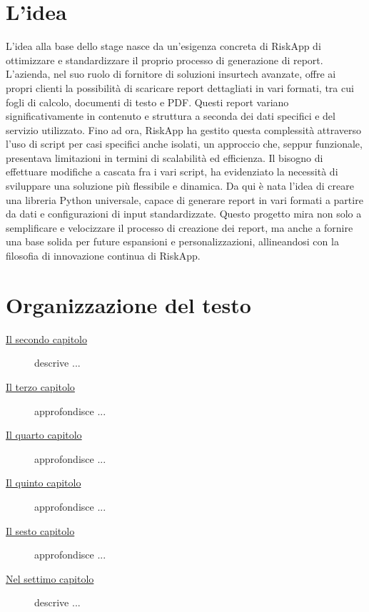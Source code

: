 \section{L'idea}
L'idea alla base dello stage nasce da un'esigenza concreta di RiskApp di ottimizzare e standardizzare il proprio processo di generazione di report. L'azienda, nel suo ruolo di fornitore di soluzioni insurtech avanzate, offre ai propri clienti la possibilità di scaricare report dettagliati in vari formati, tra cui fogli di calcolo, documenti di testo e PDF. Questi report variano significativamente in contenuto e struttura a seconda dei dati specifici e del servizio utilizzato. Fino ad ora, RiskApp ha gestito questa complessità attraverso l'uso di script per casi specifici anche isolati, un approccio che, seppur funzionale, presentava limitazioni in termini di scalabilità ed efficienza. Il bisogno di effettuare modifiche a cascata fra i vari script, ha evidenziato la necessità di sviluppare una soluzione più flessibile e dinamica. Da qui è nata l'idea di creare una libreria Python universale, capace di generare report in vari formati a partire da dati e configurazioni di input standardizzate. Questo progetto mira non solo a semplificare e velocizzare il processo di creazione dei report, ma anche a fornire una base solida per future espansioni e personalizzazioni, allineandosi con la filosofia di innovazione continua di RiskApp.

\section{Organizzazione del testo}
\begin{description}
    \item[{\hyperref[chap:processi-metodologie]{Il secondo capitolo}}] descrive ...
    
    \item[{\hyperref[chap:descrizione-stage]{Il terzo capitolo}}] approfondisce ...
    
    \item[{\hyperref[chap:analisi-requisiti]{Il quarto capitolo}}] approfondisce ...
    
    \item[{\hyperref[chap:progettazione-codifica]{Il quinto capitolo}}] approfondisce ...
    
    \item[{\hyperref[chap:verifica-validazione]{Il sesto capitolo}}] approfondisce ...
    
    \item[{\hyperref[chap:conclusioni]{Nel settimo capitolo}}] descrive ...
\end{description}

